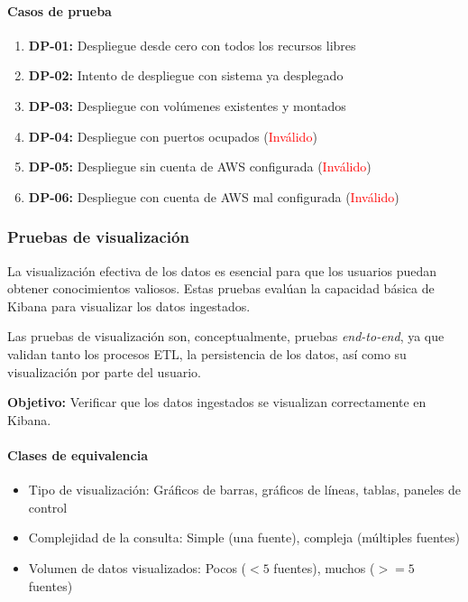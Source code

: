 \paragraph{Casos de prueba}
\begin{enumerate}
    \item \textbf{DP-01:} Despliegue desde cero con todos los recursos libres
    \item \textbf{DP-02:} Intento de despliegue con sistema ya desplegado
    \item \textbf{DP-03:} Despliegue con volúmenes existentes y montados
    \item \textbf{DP-04:} Despliegue con puertos ocupados (\textcolor{red}{Inválido})
    \item \textbf{DP-05:} Despliegue sin cuenta de AWS configurada (\textcolor{red}{Inválido})
    \item \textbf{DP-06:} Despliegue con cuenta de AWS mal configurada (\textcolor{red}{Inválido})
\end{enumerate}


\newpage{}
\subsubsection{Pruebas de visualización}
La visualización efectiva de los datos es esencial para que los usuarios
puedan obtener conocimientos valiosos. Estas pruebas evalúan la capacidad básica
de Kibana para visualizar los datos ingestados.

Las pruebas de visualización son, conceptualmente, pruebas \textit{end-to-end},
ya que validan tanto los procesos ETL, la persistencia de los datos, así como su
visualización por parte del usuario.

\textbf{Objetivo:} Verificar que los datos ingestados se visualizan
correctamente en Kibana.

\paragraph{Clases de equivalencia}
\begin{itemize}
    \item Tipo de visualización: Gráficos de barras, gráficos de líneas,
        tablas, paneles de control
    \item Complejidad de la consulta: Simple (una fuente), compleja
        (múltiples fuentes)
    \item Volumen de datos visualizados: Pocos ($<5$ fuentes),
        muchos ($>=5$ fuentes)
\end{itemize}

